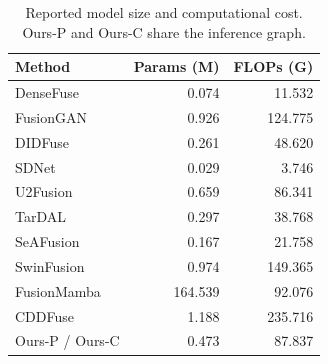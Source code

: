 \begin{table}[!t]
\centering
\caption{Reported model size and computational cost. Ours-P and Ours-C share the inference graph.}
\label{tab:complexity}
\small
\setlength{\tabcolsep}{8pt}
\begin{tabular}{@{}lrr@{}}
\toprule
Method & Params (M) & FLOPs (G)\\
\midrule
DenseFuse & 0.074 & 11.532\\
FusionGAN & 0.926 & 124.775\\
DIDFuse & 0.261 & 48.620\\
SDNet & 0.029 & 3.746\\
U2Fusion & 0.659 & 86.341\\
TarDAL & 0.297 & 38.768\\
SeAFusion & 0.167 & 21.758\\
SwinFusion & 0.974 & 149.365\\
FusionMamba & 164.539 & 92.076\\
CDDFuse & 1.188 & 235.716\\
Ours-P / Ours-C & 0.473 & 87.837\\
\bottomrule
\end{tabular}
\end{table}
